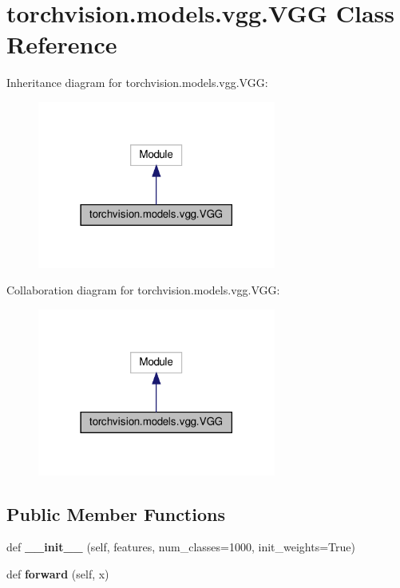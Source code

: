 \hypertarget{classtorchvision_1_1models_1_1vgg_1_1VGG}{}\section{torchvision.\+models.\+vgg.\+V\+GG Class Reference}
\label{classtorchvision_1_1models_1_1vgg_1_1VGG}


Inheritance diagram for torchvision.\+models.\+vgg.\+V\+GG\+:
\nopagebreak
\begin{figure}[H]
\begin{center}
\leavevmode
\includegraphics[width=222pt]{classtorchvision_1_1models_1_1vgg_1_1VGG__inherit__graph}
\end{center}
\end{figure}


Collaboration diagram for torchvision.\+models.\+vgg.\+V\+GG\+:
\nopagebreak
\begin{figure}[H]
\begin{center}
\leavevmode
\includegraphics[width=222pt]{classtorchvision_1_1models_1_1vgg_1_1VGG__coll__graph}
\end{center}
\end{figure}
\subsection*{Public Member Functions}
\begin{DoxyCompactItemize}
\item 
\mbox{\label{classtorchvision_1_1models_1_1vgg_1_1VGG_a55b5fc4ab748e15ec0cc2983562ccf31}} 
def {\bfseries \+\_\+\+\_\+init\+\_\+\+\_\+} (self, features, num\+\_\+classes=1000, init\+\_\+weights=True)
\item 
\mbox{\label{classtorchvision_1_1models_1_1vgg_1_1VGG_ab2196eff8b9944ea8b22159bedfc021a}} 
def {\bfseries forward} (self, x)
\end{DoxyCompactItemize}
